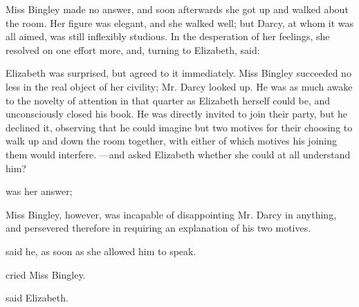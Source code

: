 
Miss Bingley made no answer, and soon afterwards she got up and walked about the room. Her figure was elegant, and she walked well; but Darcy, at whom it was all aimed, was still inflexibly studious. In the desperation of her feelings, she resolved on one effort more, and, turning to Elizabeth, said:


Elizabeth was surprised, but agreed to it immediately. Miss Bingley succeeded no less in the real object of her civility; Mr. Darcy looked up. He was as much awake to the novelty of attention in that quarter as Elizabeth herself could be, and unconsciously closed his book. He was directly invited to join their party, but he declined it, observing that he could imagine but two motives for their choosing to walk up and down the room together, with either of which motives his joining them would interfere. ---and asked Elizabeth whether she could at all understand him?

 was her answer; 

Miss Bingley, however, was incapable of disappointing Mr. Darcy in anything, and persevered therefore in requiring an explanation of his two motives.

 said he, as soon as she allowed him to speak. 

 cried Miss Bingley. 

 said Elizabeth. 

